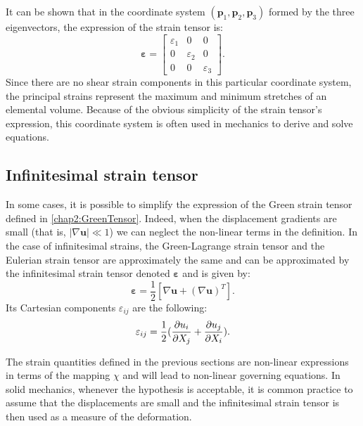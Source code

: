 It can be shown that in the coordinate system $(\mathbf{p}_1, \mathbf{p}_2, \mathbf{p}_3)$ formed by the three eigenvectors, the expression of the strain tensor is:
\begin{equation}
\boldsymbol \varepsilon =
	\begin{bmatrix}
	\varepsilon_1 &          0           &           0           \\
	         0           & \varepsilon_2 &           0           \\
	         0           &           0           & \varepsilon_3
	\end{bmatrix}	
	.
\end{equation}
Since there are no shear strain components in this particular coordinate system, the principal strains represent the maximum and minimum stretches of an elemental volume. Because of the obvious simplicity of the strain tensor's expression, this coordinate system is often used in mechanics to derive and solve equations.

		
	\subsection{Infinitesimal strain tensor} \label{chap2:infinitesimalStrainTensor}
In some cases, it is possible to simplify the expression of the Green strain tensor defined in \eqref{chap2:GreenTensor}. Indeed, when the displacement gradients are small (that is, $|\nabla \mathbf{u}| \ll 1$) we can neglect the non-linear terms in the definition. In the case of infinitesimal strains, the Green-Lagrange strain tensor and the Eulerian strain tensor are approximately the same and can be approximated by the infinitesimal strain tensor denoted $\boldsymbol \varepsilon$ and is given by:
\begin{equation}
\boldsymbol \varepsilon = \frac{1}{2} \left[ \nabla \mathbf{u} + (\nabla \mathbf{u})^T \right].
\end{equation}
Its Cartesian components $\varepsilon_{ij}$ are the following:
\begin{equation}
\varepsilon_{ij} = \frac{1}{2} (\dfrac{\partial u_i}{\partial X_j} + \dfrac{\partial u_j}{\partial X_i}).
\end{equation}

The strain quantities defined in the previous sections are non-linear expressions in terms of the mapping $\chi$ and will lead to non-linear governing equations. In solid mechanics, whenever the hypothesis is acceptable, it is common practice to assume that the displacements are small and the infinitesimal strain tensor is then used as a measure of the deformation. 

